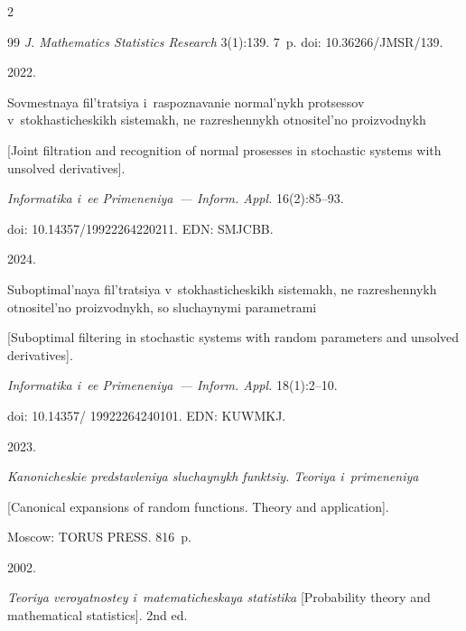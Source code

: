 \begin{multicols}{2}
{{\begin{thebibliography}{99}
\textit{J. Mathematics Statistics Research} 3(1):139. 7~p. doi: 10.36266/JMSR/139.





 2022. 

Sovmestnaya fil'tratsiya i~ras\-po\-zna\-va\-nie normal'nykh protsessov v~stokhasticheskikh sistemakh, ne razreshennykh otnositel'no proizvodnykh 

[Joint filtration and recognition of normal prosesses in stochastic systems with unsolved derivatives]. 

\textit{Informatika i~ee Primeneniya~--- Inform. Appl.} 16(2):85--93. 

doi: 10.14357/19922264220211. EDN: SMJCBB.





 2024. 

Suboptimal'naya fil'tratsiya v~stokhasticheskikh sistemakh, ne razreshennykh otnositel'no proizvodnykh, so sluchaynymi pa\-ra\-met\-ra\-mi 

[Suboptimal filtering in stochastic systems with random parameters and unsolved derivatives].

\textit{Informatika i~ee Primeneniya~--- Inform. Appl.} 18(1):2--10.

doi: 10.14357/ 19922264240101. EDN: KUWMKJ.





 2023. 

\textit{Kanonicheskie predstavleniya sluchaynykh funktsiy. Teoriya i~primeneniya} 

[Canonical expansions of random functions. Theory and application]. 

Moscow: TORUS PRESS. 816~p.











 2002. 

\textit{Teoriya veroyatnostey i~ma\-te\-ma\-ti\-che\-skaya statistika} [Probability theory and mathematical statistics]. 2nd ed. 


\end{thebibliography}}}
\end{multicols}
